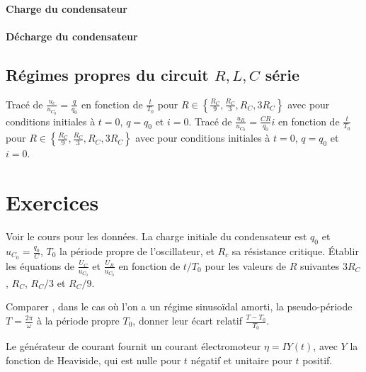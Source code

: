 		\paragraph{Charge du condensateur}

		\paragraph{Décharge du condensateur}

	\subsection{Régimes propres du circuit $R, L, C$ série}
		Tracé de $\frac{u_c}{u_{C_0}} = \frac{q}{q_0}$ en fonction de $\frac{t}{T_0}$ pour $R \in \left\{\frac{R_C}{9}, \frac{R_C}{3}, R_C, 3R_C \right\}$ avec pour conditions initiales à $t=0$, $q=q_0$ et $i=0$.
		Tracé de $\frac{u_R}{u_{C_0}} = \frac{CR}{q_0} i$ en fonction de $\frac{t}{T_0}$ pour $R \in \left\{\frac{R_C}{9}, \frac{R_C}{3}, R_C, 3R_C \right\}$ avec pour conditions initiales à $t=0$, $q=q_0$ et $i=0$.
\section{Exercices}
	\begin{exercice}
		Voir le cours pour les données. La charge initiale du condensateur est $q_0$ et $u_{C_0} = \frac{q_0}{C}$, $T_0$ la période propre de l'oscillateur, et $R_c$ sa résistance critique. Établir les équations de $\frac{U_C}{u_{C_0}}$ et $\frac{U_R}{u_{C_0}}$ en fonction de $t/T_0$ pour les valeurs de $R$ suivantes $3R_C$, $R_C$, $R_C/3$ et $R_C/9$.

		Comparer , dans le cas où l'on a un régime sinusoïdal amorti, la pseudo-période $T=\frac{2\pi}{\omega}$ à la période propre $T_0$, donner leur écart relatif $\frac{T-T_0}{T_0}$.
	\end{exercice}

	\begin{exercice}
		Le générateur de courant fournit un courant électromoteur $\eta = I Y(t)$, avec $Y$ la fonction de Heaviside, qui est nulle pour $t$ négatif et unitaire pour $t$ positif.

	\end{exercice}
